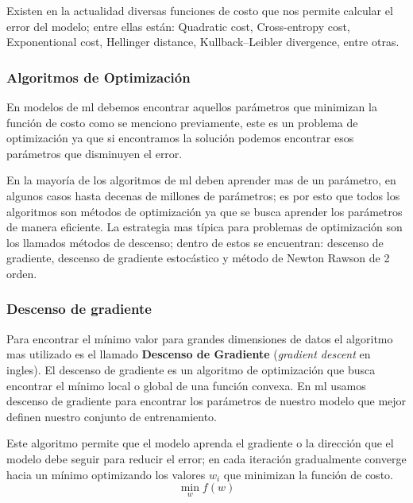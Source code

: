 Existen en la actualidad diversas funciones de costo que nos permite calcular el error del modelo; entre ellas están: Quadratic cost, Cross-entropy cost, Exponentional cost, Hellinger distance, Kullback–Leibler divergence, entre otras.


\subsubsection{Algoritmos de Optimización} 
En modelos de \ac{ml} debemos encontrar aquellos parámetros que minimizan la función de costo como se menciono previamente, este es un problema de optimización ya que si encontramos la solución podemos encontrar esos parámetros que disminuyen el error.

En la mayoría de los algoritmos de \ac{ml} deben aprender mas de un parámetro, en algunos casos hasta decenas de millones de parámetros; es por esto que todos los algoritmos  son métodos de optimización ya que se busca aprender los parámetros de manera eficiente. La estrategia mas típica para problemas de optimización son los llamados métodos de descenso; dentro de estos se encuentran: descenso de gradiente, descenso de gradiente estocástico y método de Newton Rawson de 2 orden.

\subsubsection*{Descenso de gradiente}\label{sub:gradient-desc}
Para encontrar el mínimo valor para grandes dimensiones de datos el algoritmo mas utilizado es el llamado \textbf{Descenso de Gradiente} (\textit{gradient descent} en ingles). El descenso de gradiente es un algoritmo de optimización que busca encontrar el mínimo local o global de una función convexa.  En \ac{ml} usamos descenso de gradiente para encontrar los parámetros de nuestro modelo que mejor definen nuestro conjunto de entrenamiento.

Este algoritmo permite que el modelo aprenda el gradiente o la dirección que el modelo debe seguir para reducir el error; en cada iteración gradualmente converge hacia un mínimo optimizando los valores $w_i $ que minimizan la función de costo. $$\min_{w} f(w)$$

